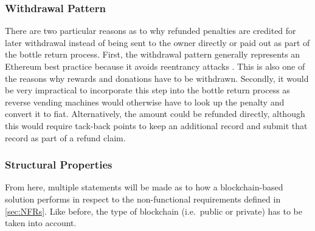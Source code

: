 \subsubsection{Withdrawal Pattern}
There are two particular reasons as to why refunded penalties are credited for later withdrawal instead of being sent to the owner directly or paid out as part of the bottle return process. First, the withdrawal pattern generally represents an Ethereum best practice because it avoids reentrancy attacks \cite[pp.~121, 169]{solidityDocs}. This is also one of the reasons why rewards and donations have to be withdrawn. Secondly, it would be very impractical to incorporate this step into the bottle return process as reverse vending machines would otherwise have to look up the penalty and convert it to fiat. Alternatively, the amount could be refunded directly, although this would require tack-back points to keep an additional record and submit that record as part of a refund claim.

\subsubsection{Structural Properties}
\label{sec:blockchainValueAdd}
From here, multiple statements will be made as to how a blockchain-based solution performs in respect to the non-functional requirements defined in \autoref{sec:NFRs}. Like before, the type of blockchain (i.e.~public or private) has to be taken into account.

